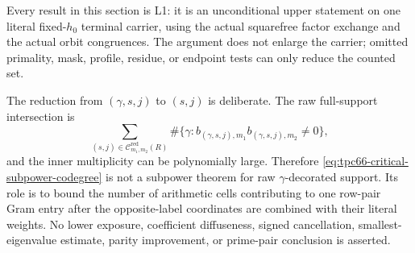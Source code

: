 \begin{remark}
\label{rem:tpc66-codegree-scope}
Every result in this section is L1: it is an unconditional upper
statement on one literal fixed-\(h_0\) terminal carrier, using the actual
squarefree factor exchange and the actual orbit congruences.  The
argument does not enlarge the carrier; omitted primality, mask, profile,
residue, or endpoint tests can only reduce the counted set.

The reduction from \((\gamma,s,j)\) to \((s,j)\) is deliberate.  The raw
full-support intersection is
\[
 \sum_{(s,j)\in\mathcal C^{\mathrm{red}}_{m_1,m_2}(R)}
 \#\{\gamma:
   b_{(\gamma,s,j),m_1}b_{(\gamma,s,j),m_2}\ne0\},
 \]
and the inner multiplicity can be polynomially large.  Therefore
\eqref{eq:tpc66-critical-subpower-codegree} is not a subpower theorem
for raw \(\gamma\)-decorated support.  Its role is to bound the number of
arithmetic cells contributing to one row-pair Gram entry after the
opposite-label coordinates are combined with their literal weights.
No lower exposure, coefficient diffuseness, signed cancellation,
smallest-eigenvalue estimate, parity improvement, or prime-pair
conclusion is asserted.
\end{remark}
